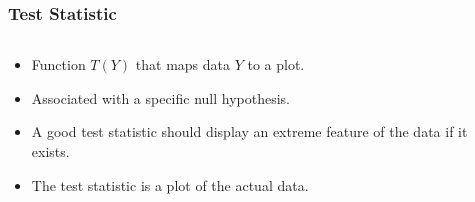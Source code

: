 \documentclass{beamer}
\begin{document}


\begin{frame}
  \frametitle{Test Statistic}
  
	\begin{columns}
	
		\begin{column}{0.4\textwidth}
		  \begin{itemize}
			  \item Function $T(Y)$ that maps data $Y$ to a plot.
			  \item Associated with a specific null hypothesis.
			  \item A good test statistic should display an extreme feature of the data if it exists.
			  \item The test statistic is a plot of the actual data.		
		 \end{itemize}		
		\end{column}
		
		\begin{column}{0.6\textwidth}
			 \begin{center}  \end{center}
		\end{column}
		
	\end{columns} 
	
\end{frame}
\end{document}
